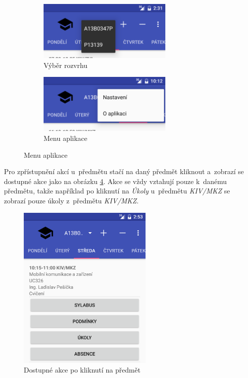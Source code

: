 \documentclass[12pt, a4paper]{article}
\begin{document}
\begin{figure}[ht!]
\begin{subfigure}{.5\textwidth}
			\end{subfigure}
			\begin{subfigure}{.5\textwidth}
				\centering
				\caption{Výběr rozvrhu}
				\label{personalNumbers}
				\includegraphics[width=6.5cm]{img/personalNumbers.png}
			\end{subfigure}%
			\begin{subfigure}{.5\textwidth}
				\centering
				\caption{Menu aplikace}
				\label{menu}
				\includegraphics[width=6.5cm]{img/menu.png}
			\end{subfigure}
		\end{figure}
		
		Pro zpřístupnění akcí u~předmětu stačí na daný předmět kliknout a~zobrazí se dostupné akce jako na obrázku \ref{subjectActions}. Akce se vždy vztahují pouze k~danému předmětu, takže například po kliknutí na \emph{Úkoly} u~předmětu \emph{KIV/MKZ} se zobrazí pouze úkoly z~předmětu \emph{KIV/MKZ}.
		
		\begin{figure}[ht!]
			\centering
			\caption{Dostupné akce po kliknutí na předmět}
			\label{subjectActions}
			\includegraphics[width=6.5cm]{img/subjectActions.png}
		\end{figure}
		\FloatBarrier
		
\end{document}
